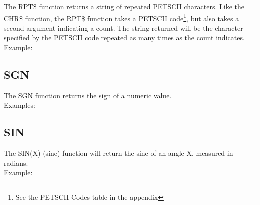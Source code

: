 The {\ttfamily RPT\$} function returns a string of repeated PETSCII characters.
Like the {\ttfamily CHR\$} function, the {\ttfamily RPT\$} function takes a
PETSCII code\footnote{See the PETSCII Codes table in the appendix}, but also
takes a second argument indicating a count.  The string returned will be the
character specified by the PETSCII code repeated as many times as the count
indicates.\\

Example:\\


\subsection{SGN}

The {\ttfamily SGN} function returns the sign of a numeric value.\\

Examples:\\


\subsection{SIN}

The {\ttfamily SIN(X)} (sine) function will return the sine of an angle
{\ttfamily X}, measured in radians.\\

Example:\\


